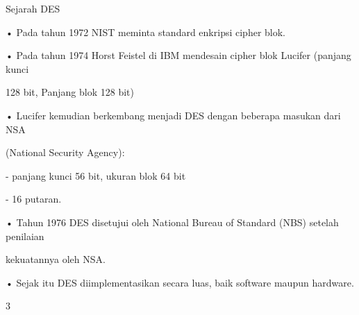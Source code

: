 \documentclass{article}
\begin{document}

Sejarah DES

• Pada tahun 1972 NIST meminta standard enkripsi cipher blok.

• Pada tahun 1974 Horst Feistel di IBM mendesain cipher blok Lucifer (panjang kunci 

128 bit, Panjang blok 128 bit)

• Lucifer kemudian berkembang menjadi DES dengan beberapa masukan dari NSA 

(National Security Agency):

    - panjang kunci 56 bit, ukuran blok 64 bit

    - 16 putaran. 

• Tahun 1976 DES disetujui oleh National Bureau of Standard (NBS) setelah penilaian 

kekuatannya oleh NSA.

• Sejak itu DES diimplementasikan secara luas, baik software maupun hardware.

3
\end{document}
